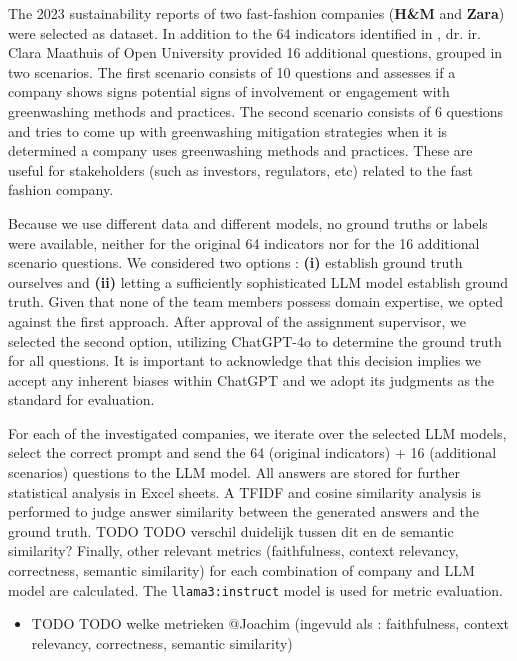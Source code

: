 \documentclass[]{article}
\begin{document}
The 2023 sustainability reports of two fast-fashion companies (\textbf{H\&M} and \textbf{Zara}) were selected as dataset.
In addition to the 64 indicators identified in \cite{durability}, dr. ir. Clara Maathuis of Open University \cite{ou} provided 16 additional questions, grouped in two scenarios.
The first scenario consists of 10 questions and assesses if a company shows signs potential signs of involvement or engagement with greenwashing methods and practices.
The second scenario consists of 6 questions and tries to come up with greenwashing mitigation strategies when it is determined a company uses greenwashing methods and practices.
These are useful for stakeholders (such as investors, regulators, etc) related to the fast fashion company.

Because we use different data and different models, no ground truths or labels were available, neither for the original 64 indicators nor for the 16 additional scenario questions.
We considered two options : \textbf{(i)} establish ground truth ourselves and \textbf{(ii)} letting a sufficiently sophisticated LLM model establish ground truth.
Given that none of the team members possess domain expertise, we opted against the first approach.
After approval of the assignment supervisor, we selected the second option, utilizing ChatGPT-4o to determine the ground truth for all questions.
It is important to acknowledge that this decision implies we accept any inherent biases within ChatGPT and we adopt its judgments as the standard for evaluation.

For each of the investigated companies, we iterate over the selected LLM models, select the correct prompt and send the 64 (original indicators) + 16 (additional scenarios) questions to the LLM model.
All answers are stored for further statistical analysis in Excel sheets.
A TFIDF and cosine similarity analysis is performed to judge answer similarity between the generated answers and the ground truth.  TODO TODO verschil duidelijk tussen dit en de semantic similarity?
Finally, other relevant metrics (faithfulness, context relevancy, correctness, semantic similarity) for each combination of company and LLM model are calculated.
The \texttt{llama3:instruct} model is used for metric evaluation.

\begin{itemize}
    \item TODO TODO welke metrieken @Joachim (ingevuld als : faithfulness, context relevancy, correctness, semantic similarity)
\end{itemize}
\end{document}
